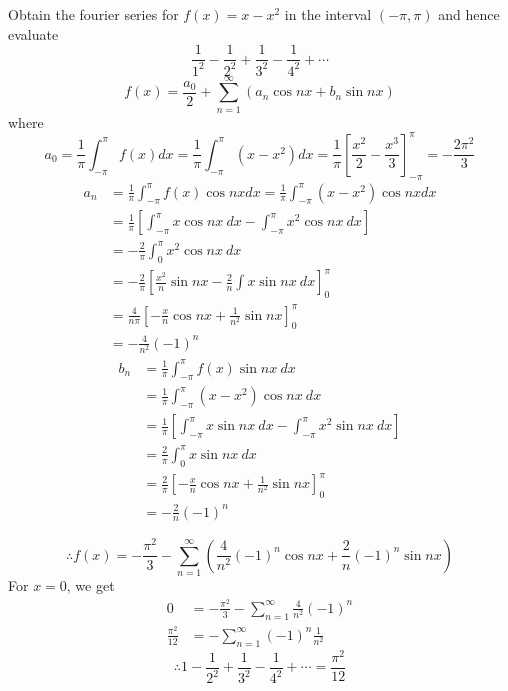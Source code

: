 \documentclass[12pt]{article}
\numberwithin{equation}{subsection}
\begin{document}
\begin{example}{Obtain the fourier series for $f(x) = x - x^2$ in the interval $(-\pi, \pi)$ and hence evaluate \[
    \frac{1}{1^2} - \frac{1}{2^2} + \frac{1}{3^2} - \frac{1}{4^2} + \cdots
\]}{}
    \[
        f(x) = \frac{a_0}{2} + \sum_{n=1}^{\infty} \left( a_n \cos{nx} + b_n \sin{nx} \right)
    \] where \[
        a_0 = \frac{1}{\pi} \int_{-\pi}^{\pi} f(x) dx = \frac{1}{\pi} \int_{-\pi}^{\pi} (x - x^2) dx = \frac{1}{\pi} \left[ \frac{x^2}{2} - \frac{x^3}{3} \right]_{-\pi}^{\pi} = -\frac{2\pi^2}{3}
    \]
    \begin{align*}
        a_n &= \frac{1}{\pi} \int_{-\pi}^{\pi} f(x) \cos{nx} dx = \frac{1}{\pi} \int_{-\pi}^{\pi} (x - x^2) \cos{nx} dx \\
        &= \frac{1}{\pi} \left[ \int_{-\pi}^{\pi} {x \cos{nx}} \: d{x} - \int_{-\pi}^{\pi} {x^2 \cos{nx}} \: d{x} \right] \\
        &= -\frac{2}{\pi} \int_{0}^{\pi} {x^2 \cos{nx}} \: d{x} \\
        &= -\frac{2}{\pi} \left[ \frac{x^2}{n} \sin{nx} - \frac{2}{n} \int{x \sin{nx}} \: d{x} \right]_{0}^{\pi} \\
        &= \frac{4}{n\pi} \left[ -\frac{x}{n} \cos{nx} + \frac{1}{n^2} \sin{nx} \right]_{0}^{\pi} \\
        &= -\frac{4}{n^2} (-1)^{n}
    \end{align*}
    \begin{align*}
        b_n &= \frac{1}{\pi} \int_{-\pi}^{\pi} {f(x) \sin{nx}} \: d{x} \\
        &= \frac{1}{\pi} \int_{-\pi}^{\pi} {(x-x^2) \cos{nx}} \: d{x} \\
        &= \frac{1}{\pi} \left[ \int_{-\pi}^{\pi} {x \sin{nx}} \: d{x} - \int_{-\pi}^{\pi} {x^2 \sin{nx}} \: d{x} \right] \\
        &= \frac{2}{\pi} \int_{0}^{\pi} {x \sin{nx}} \: d{x} \\
        &= \frac{2}{\pi} \left[ -\frac{x}{n} \cos{nx} + \frac{1}{n^2} \sin{nx} \right]_{0}^{\pi} \\
        &= - \frac{2}{n} (-1)^{n}
    \end{align*}

    \[
        \therefore f(x) = -\frac{\pi^2}{3} - \sum_{n=1}^{\infty} \left( \frac{4}{n^2} (-1)^{n} \cos{nx} + \frac{2}{n} (-1)^{n} \sin{nx} \right)
    \]
    For $x=0$, we get
    \begin{align*}
        0 &= -\frac{\pi^2}{3} - \sum_{n=1}^{\infty} \frac{4}{n^2} (-1)^n \\
        \frac{\pi^2}{12} &= - \sum_{n=1}^{\infty} (-1)^n \frac{1}{n^2}
    \end{align*}
    \[
        \boxed{ \therefore 1 - \frac{1}{2^2} + \frac{1}{3^2} - \frac{1}{4^2} + \cdots = \frac{\pi^2}{12} }
    \]
\end{example}
\end{document}
